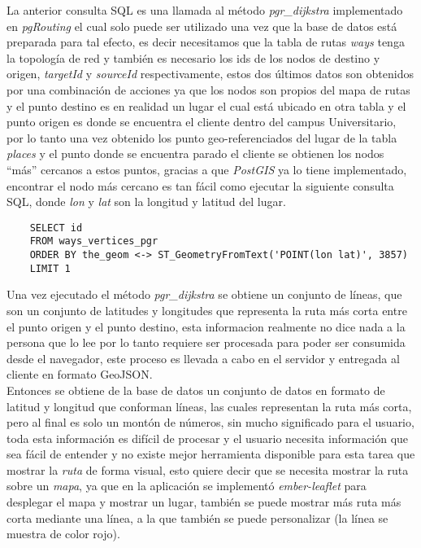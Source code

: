 La anterior consulta SQL es una llamada al método \emph{pgr\_dijkstra} implementado en \emph{pgRouting} el cual solo puede ser utilizado una vez que la base de datos está preparada para tal efecto, es decir necesitamos que la tabla de rutas \emph{ways} tenga la topología de red y también es necesario los ids de los nodos de destino y origen, \emph{targetId} y \emph{sourceId} respectivamente, estos dos últimos datos son obtenidos por una combinación de acciones ya que los nodos son propios del mapa de rutas y el punto destino es en realidad un lugar el cual está ubicado en otra tabla y el punto origen es donde se encuentra el cliente dentro del campus Universitario, por lo tanto una vez obtenido los punto geo-referenciados del lugar de la tabla \emph{places} y el punto donde se encuentra parado el cliente se obtienen los nodos ``más'' cercanos a estos puntos, gracias a que \emph{PostGIS} ya lo tiene implementado, encontrar el nodo más cercano es tan fácil como ejecutar la siguiente consulta SQL, donde \emph{lon} y \emph{lat} son la longitud y latitud del lugar.

\begin{verbatim}
    SELECT id
    FROM ways_vertices_pgr
    ORDER BY the_geom <-> ST_GeometryFromText('POINT(lon lat)', 3857)
    LIMIT 1
\end{verbatim}

Una vez ejecutado el método \emph{pgr\_dijkstra} se obtiene un conjunto de líneas, que son un conjunto de latitudes y longitudes que representa la ruta más corta entre el punto origen y el punto destino, esta informacion realmente no dice nada a la persona que lo lee por lo tanto requiere ser procesada para poder ser consumida desde el navegador, este proceso es llevada a cabo en el servidor y entregada al cliente en formato GeoJSON.\\







Entonces se obtiene
de la base de datos un conjunto de datos en formato de latitud y longitud que conforman líneas, las cuales representan la ruta más corta, pero al final es solo un montón de números, sin mucho significado para el usuario, toda esta información es difícil de procesar y el usuario necesita información que sea fácil de entender y no existe mejor herramienta disponible para esta tarea que mostrar la \emph{ruta} de forma visual, esto quiere decir que se necesita mostrar la ruta sobre un \emph{mapa}, ya que en la aplicación se implementó \emph{ember-leaflet} para desplegar el mapa y mostrar un lugar, también se puede  mostrar más ruta más corta mediante una línea, a la que también se puede personalizar (la línea se muestra de color rojo).\\

